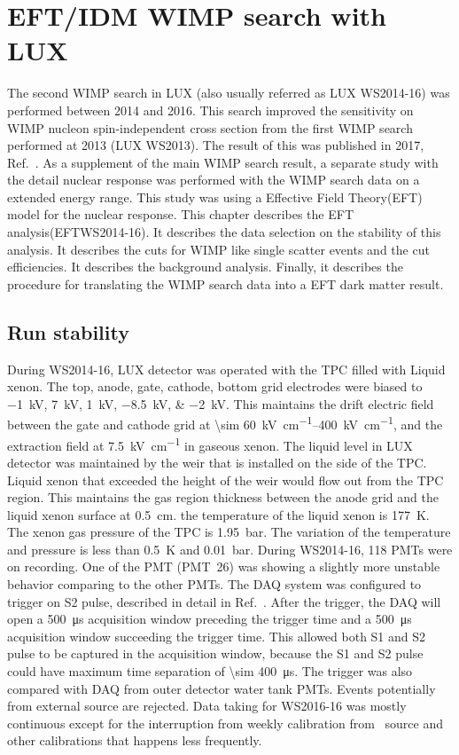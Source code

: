 \label{chap:eft}

\chapter{EFT/IDM WIMP search with LUX}

The second WIMP search in LUX (also usually referred as LUX WS2014-16) was performed between 2014 and 2016. This search improved the sensitivity on WIMP nucleon spin-independent cross section from the first WIMP search performed at 2013 (LUX WS2013). The result of this was published in 2017, Ref.~\cite{Akerib2017a}. As a supplement of the main WIMP search result, a separate study with the detail nuclear response was performed with the WIMP search data on a extended energy range. This study was using a Effective Field Theory(EFT) model for the nuclear response. This chapter describes the EFT analysis(EFTWS2014-16). It describes the data selection on the stability of this analysis. It describes the cuts for WIMP like single scatter events and the cut efficiencies. It describes the background analysis. Finally, it describes the procedure for translating the WIMP search data into a EFT dark matter result.

\section{Run stability}
During WS2014-16, LUX detector was operated with the TPC filled with Liquid xenon. The top, anode, gate, cathode, bottom grid electrodes were biased to \SIlist{-1; 7; 1; -8.5; -2}{\kV}. %
This maintains the drift electric field between the gate and cathode grid at \SIrange{\sim 60}{400}{\kV\per\cm}, and the extraction field at \SI{7.5}{\kV\per\cm} in gaseous xenon. The liquid level in LUX detector was maintained by the weir that is installed on the side of the TPC. Liquid xenon that exceeded the height of the weir would flow out from the TPC region. This maintains the gas region thickness between the anode grid and the liquid xenon surface at \SI{0.5}{\cm}.  the temperature of the liquid xenon is \SI{177}{\kelvin}. The xenon gas pressure of the TPC is \SI{1.95}{\bar}. The variation of the temperature and pressure is less than \SI{0.5}{\kelvin} and \SI{0.01}{\bar}. 
During WS2014-16, 118 PMTs were on recording. One of the PMT (PMT~26) was showing a slightly more unstable behavior comparing to the other PMTs. The DAQ system was configured to trigger on S2 pulse, described in detail in Ref.~\cite{Akerib2016b}. After the trigger, the DAQ will open a \SI{500}{\us} acquisition window preceding the trigger time and a \SI{500}{\us} acquisition window succeeding the trigger time. This allowed both S1 and S2 pulse to be captured in the acquisition window, because the S1 and S2 pulse could have maximum time separation of \SI{\sim 400}{\us}. The trigger was also compared with DAQ from outer detector water tank PMTs. Events potentially from external source are rejected. Data taking for WS2016-16 was mostly continuous except for the interruption from weekly calibration from \kreightthreem\ source and other calibrations that happens less frequently.      

